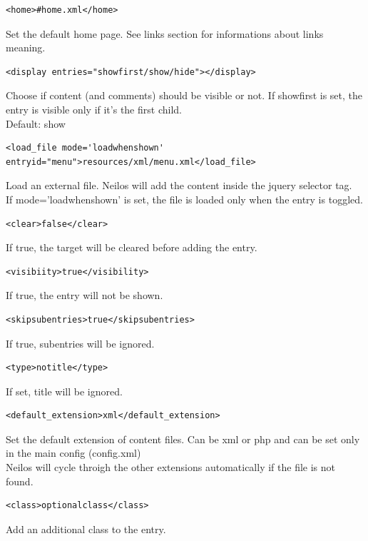 \documentclass[a4paper,12pt]{article}
\begin{document}
\begin{list}{-}{}
\begin{verbatim}
<home>#home.xml</home>
      \end{verbatim}
Set the default home page. See links section for informations about links meaning.
\item \begin{verbatim}
<display entries="showfirst/show/hide"></display>
\end{verbatim}
Choose if content (and comments) should be visible or not. If showfirst is set, the entry is visible only if it's the first child.\\
Default: show
\item \begin{verbatim}
<load_file mode='loadwhenshown' 
entryid="menu">resources/xml/menu.xml</load_file>
      \end{verbatim}
Load an external file. Neilos will add the content inside the jquery selector tag.\\
If mode='loadwhenshown' is set, the file is loaded only when the entry is toggled.
\item \begin{verbatim}
<clear>false</clear>
\end{verbatim}
If true, the target will be cleared before adding the entry.
\item \begin{verbatim}
<visibiity>true</visibility>
\end{verbatim}
If true, the entry will not be shown.
\item \begin{verbatim}
<skipsubentries>true</skipsubentries>
\end{verbatim}
If true, subentries will be ignored.
\item \begin{verbatim}
<type>notitle</type>
\end{verbatim}
If set, title will be ignored.
\item \begin{verbatim}
<default_extension>xml</default_extension>
\end{verbatim}
Set the default extension of content files. Can be xml or php and can be set only in the main config (config.xml)\\
Neilos will cycle throigh the other extensions automatically if the file is not found.
\item \begin{verbatim}
<class>optionalclass</class>
\end{verbatim}
Add an additional class to the entry.

\end{list}
\end{document}
